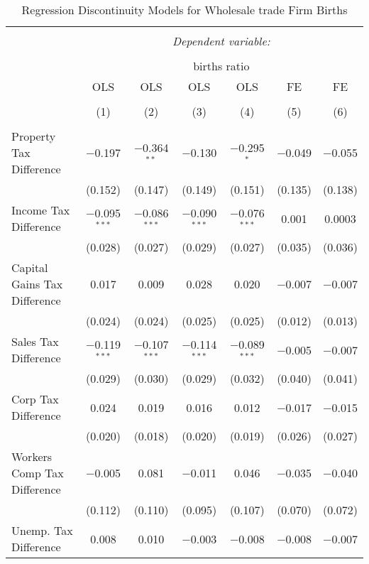 
\begin{table}[!htbp] \centering 
  \caption{Regression Discontinuity Models for  Wholesale trade Firm Births} 
  \label{42rd} 
\footnotesize 
\begin{tabular}{@{\extracolsep{5pt}}lcccccc} 
\\[-1.8ex]\hline 
\hline \\[-1.8ex] 
 & \multicolumn{6}{c}{\textit{Dependent variable:}} \\ 
\cline{2-7} 
\\[-1.8ex] & \multicolumn{6}{c}{births ratio} \\ 
 & OLS & OLS & OLS & OLS & FE & FE \\ 
\\[-1.8ex] & (1) & (2) & (3) & (4) & (5) & (6)\\ 
\hline \\[-1.8ex] 
 Property Tax Difference & $-$0.197 & $-$0.364$^{**}$ & $-$0.130 & $-$0.295$^{*}$ & $-$0.049 & $-$0.055 \\ 
  & (0.152) & (0.147) & (0.149) & (0.151) & (0.135) & (0.138) \\ 
  Income Tax Difference & $-$0.095$^{***}$ & $-$0.086$^{***}$ & $-$0.090$^{***}$ & $-$0.076$^{***}$ & 0.001 & 0.0003 \\ 
  & (0.028) & (0.027) & (0.029) & (0.027) & (0.035) & (0.036) \\ 
  Capital Gains Tax Difference & 0.017 & 0.009 & 0.028 & 0.020 & $-$0.007 & $-$0.007 \\ 
  & (0.024) & (0.024) & (0.025) & (0.025) & (0.012) & (0.013) \\ 
  Sales Tax Difference & $-$0.119$^{***}$ & $-$0.107$^{***}$ & $-$0.114$^{***}$ & $-$0.089$^{***}$ & $-$0.005 & $-$0.007 \\ 
  & (0.029) & (0.030) & (0.029) & (0.032) & (0.040) & (0.041) \\ 
  Corp Tax Difference & 0.024 & 0.019 & 0.016 & 0.012 & $-$0.017 & $-$0.015 \\ 
  & (0.020) & (0.018) & (0.020) & (0.019) & (0.026) & (0.027) \\ 
  Workers Comp Tax Difference & $-$0.005 & 0.081 & $-$0.011 & 0.046 & $-$0.035 & $-$0.040 \\ 
  & (0.112) & (0.110) & (0.095) & (0.107) & (0.070) & (0.072) \\ 
  Unemp. Tax Difference & 0.008 & 0.010 & $-$0.003 & $-$0.008 & $-$0.008 & $-$0.007 \\ 

\end{tabular}
\end{table}
